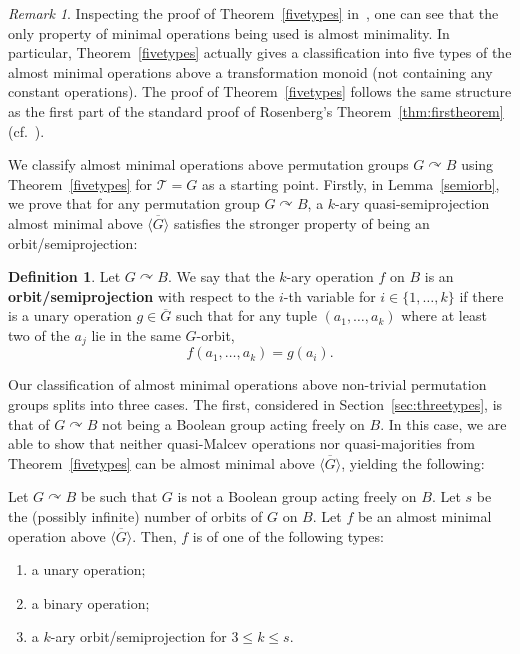 \documentclass{article}
\newenvironment{customthm}[1]
  {\renewcommand\theinnercustomthm{#1}\innercustomthm}
  {\endinnercustomthm}
\theoremstyle{remark}
\newtheorem{remark}[theorem]{Remark}
\theoremstyle{definition}
\newtheorem{definition}[theorem]{Definition}
\def\acts{\curvearrowright}
\begin{document}
\begin{remark}\label{rem:onlyalmostmin} Inspecting the proof of Theorem~\ref{fivetypes} in~\cite[\S 6.1.8]{BodCSP}, one can see that the only property of minimal operations being used is almost minimality. In particular, Theorem~\ref{fivetypes} actually gives a classification into five types of the almost minimal operations above a transformation monoid (not containing any constant operations). The proof of Theorem~\ref{fivetypes} follows the same structure as the first part of the standard proof of Rosenberg's Theorem~\ref{thm:firstheorem} (cf.~\cite{fivetypes, csakany2005minimal}).
\end{remark}




We classify almost minimal operations above permutation groups $G\acts B$ using Theorem~\ref{fivetypes} for $\mathcal{T}=G$ as a starting point. Firstly, in Lemma~\ref{semiorb}, we prove that for any permutation group $G\acts B$, a $k$-ary quasi-semiprojection almost minimal above $\overline{\langle G\rangle}$ satisfies the stronger property of being an orbit\-/semiprojection:

\begin{definition}\label{def:orbitsemi} Let $G\acts B$. We say that the $k$-ary operation $f$ on $B$ is an \textbf{orbit\-/semiprojection} with respect to the $i$-th variable for $i\in\{1, \dots, k\}$ if there is a unary operation $g\in\overline{G}$ such that for any tuple $(a_1, \dots, a_k)$ where at least two of the $a_j$ lie in the same $G$-orbit, 
\[f(a_1, \dots, a_k)=g(a_i).\]
\end{definition}


Our classification of almost minimal operations above non-trivial permutation groups splits into three cases. The first, considered in Section~\ref{sec:threetypes}, is that of $G\acts B$ not being a Boolean group acting freely on $B$. In this case, we are able to show that neither quasi-Malcev operations nor quasi-majorities from Theorem~\ref{fivetypes} can be almost minimal above $\overline{\langle G\rangle}$, yielding the following:


\begin{customthm}{C}[Theorem~\ref{thm:threetypes}, Three Types Theorem] \label{thmc}
Let $G\acts B$ be such that $G$ is not a Boolean group acting freely on $B$. Let $s$ be the (possibly infinite) number of orbits of $G$ on $B$. Let $f$ be an almost minimal operation above $\overline{\langle G \rangle}$. Then, $f$ is of one of the following types:
\begin{enumerate}
    \item a unary operation;
    \item a binary operation;
    \item a $k$-ary orbit\-/semiprojection for $3\leq k \leq s$.
\end{enumerate}
\end{customthm}
\end{document}
